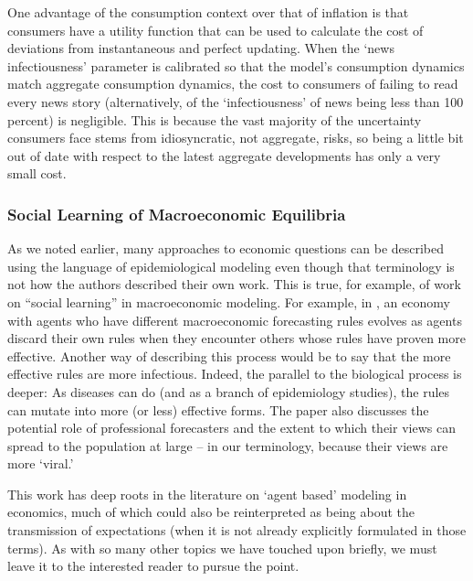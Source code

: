 One advantage of the consumption context over that of inflation is that consumers have a utility function that can be used to calculate the cost of deviations from instantaneous and perfect updating.  When the `news infectiousness' parameter is calibrated so that the model's consumption dynamics match aggregate consumption dynamics, the cost to consumers of failing to read every news story (alternatively, of the `infectiousness' of news being less than 100 percent) is negligible.  This is because the vast majority of the uncertainty consumers face stems from idiosyncratic, not aggregate, risks, so being a little bit out of date with respect to the latest aggregate developments has only a very small cost.

\subsubsection{Social Learning of Macroeconomic Equilibria}

As we noted earlier, many approaches to economic questions can be described using the language of epidemiological modeling even though that terminology is not how the authors described their own work.  This is true, for example, of work on ``social learning'' in macroeconomic modeling.  For example, in \cite{arifovic2018learning}, an economy with agents who have different macroeconomic forecasting rules evolves as agents discard their own rules when they encounter others whose rules have proven more effective.  Another way of describing this process would be to say that the more effective rules are more infectious.  Indeed, the parallel to the biological process is deeper: As diseases can do (and as a branch of epidemiology studies), the rules can mutate into more (or less) effective forms.  The paper also discusses the potential role of professional forecasters and the extent to which their views can spread to the population at large -- in our terminology, because their views are more `viral.'

This work has deep roots in the literature on `agent based' modeling in economics, much of which could also be reinterpreted as being about the transmission of expectations (when it is not already explicitly formulated in those terms).  As with so many other topics we have touched upon briefly, we must leave it to the interested reader to pursue the point.

